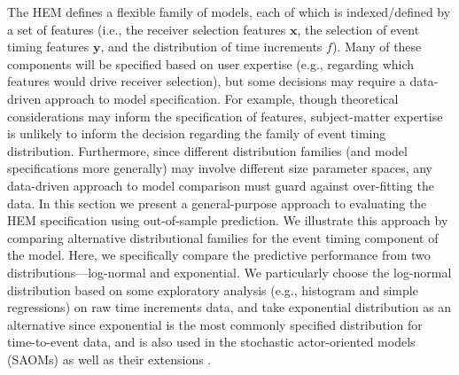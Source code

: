 \documentclass[ba]{imsart}
\numberwithin{equation}{section}
\theoremstyle{plain}
\begin{document}
	The HEM defines a flexible family of models, each of which is indexed/defined by a set of features (i.e., the receiver selection features $\boldsymbol{x}$, the selection of event timing features $\boldsymbol{y}$, and the distribution of time increments $f$). Many of these components will be specified based on user expertise (e.g., regarding which features would drive receiver selection), but some decisions may require a data-driven approach to model specification. For example, though theoretical considerations may inform the specification of features, subject-matter expertise is unlikely to inform the decision regarding the family of event timing distribution. Furthermore, since different distribution families (and model specifications more generally) may involve different size parameter spaces, any data-driven approach to model comparison must guard against over-fitting the data. In this section we present a general-purpose approach to evaluating the HEM specification using out-of-sample prediction. We illustrate this approach by comparing alternative distributional families for the event timing component of the model. Here, we specifically compare the predictive performance from two distributions---log-normal and exponential. We particularly choose the log-normal distribution based on some exploratory analysis (e.g., histogram and simple regressions) on raw time increments data, and take exponential distribution as an alternative since exponential is the most commonly specified distribution for time-to-event data, and is also used in the stochastic actor-oriented models (SAOMs) \citep{snijders1996stochastic} as well as their extensions \citep{snijders2007modeling}. 
\end{document}
